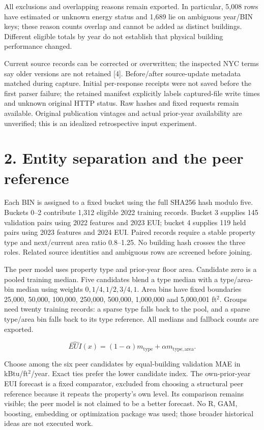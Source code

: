 \documentclass[10pt,letterpaper]{article}
\begin{document}
All exclusions and overlapping reasons remain exported. In particular, 5,008 rows have estimated or unknown energy status and 1,689 lie on ambiguous year/BIN keys; these reason counts overlap and cannot be added as distinct buildings. Different eligible totals by year do not establish that physical building performance changed.

Current source records can be corrected or overwritten; the inspected NYC terms say older versions are not retained [4]. Before/after source-update metadata matched during capture. Initial per-response receipts were not saved before the first parser failure; the retained manifest explicitly labels captured-file write times and unknown original HTTP status. Raw hashes and fixed requests remain available. Original publication vintages and actual prior-year availability are unverified; this is an idealized retrospective input experiment.

\newpage
\section*{2. Entity separation and the peer reference}
Each BIN is assigned to a fixed bucket using the full SHA256 hash modulo five. Buckets 0--2 contribute 1,312 eligible 2022 training records. Bucket 3 supplies 145 validation pairs using 2022 features and 2023 EUI; bucket 4 supplies 119 held pairs using 2023 features and 2024 EUI. Paired records require a stable property type and next/current area ratio 0.8--1.25. No building hash crosses the three roles. Related source identities and ambiguous rows are screened before joining.

The peer model uses property type and prior-year floor area. Candidate zero is a pooled training median. Five candidates blend a type median with a type/area-bin median using weights $0,1/4,1/2,3/4,1$. Area bins have fixed boundaries 25,000, 50,000, 100,000, 250,000, 500,000, 1,000,000 and 5,000,001 ft$^2$. Groups need twenty training records: a sparse type falls back to the pool, and a sparse type/area bin falls back to its type reference. All medians and fallback counts are exported.

\[
\widehat{EUI}(x)=(1-\alpha)m_{\mathrm{type}}+\alpha m_{\mathrm{type,area}}.
\]

Choose among the six peer candidates by equal-building validation MAE in kBtu/ft$^2$/year. Exact ties prefer the lower candidate index. The own-prior-year EUI forecast is a fixed comparator, excluded from choosing a structural peer reference because it repeats the property's own level. Its comparison remains visible; the peer model is not claimed to be a better forecast. No R, GAM, boosting, embedding or optimization package was used; those broader historical ideas are not executed work.
\end{document}

